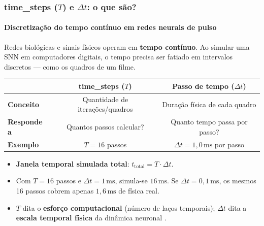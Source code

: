 \begin{frame}
	\frametitle{time\_steps ($T$) e $\Delta t$: o que são?}
	\framesubtitle{Discretização do tempo contínuo em redes neurais de pulso}
	\small
	\par Redes biológicas e sinais físicos operam em \textbf{tempo contínuo}. Ao simular uma SNN em computadores digitais, o tempo precisa ser fatiado em intervalos discretos --- como os quadros de um filme.
	\begin{center}
		\footnotesize
		\begin{tabular}{lcc}
			\toprule
			& \textbf{time\_steps ($T$)} & \textbf{Passo de tempo ($\Delta t$)} \\
			\midrule
			\textbf{Conceito} & Quantidade de iterações/quadros & Duração física de cada quadro \\
			\textbf{Responde a} & Quantos passos calcular? & Quanto tempo passa por passo? \\
			\textbf{Exemplo} & $T = 16$ passos & $\Delta t = 1{,}0\,\text{ms}$ por passo \\
			\bottomrule
		\end{tabular}
	\end{center}
	\begin{itemize}
		\setlength{\itemsep}{1pt}
		\item \textbf{Janela temporal simulada total}: $t_{\mathrm{total}} = T \cdot \Delta t$.
		\item Com $T=16$ passos e $\Delta t=1\,\text{ms}$, simula-se $16\,\text{ms}$. Se $\Delta t = 0{,}1\,\text{ms}$, os mesmos 16 passos cobrem apenas $1{,}6\,\text{ms}$ de física real.
		\item $T$ dita o \textbf{esforço computacional} (número de laços temporais); $\Delta t$ dita a \textbf{escala temporal física} da dinâmica neuronal \cite{gerstner2014neuronal, eshraghian2023training}.
	\end{itemize}
\end{frame}

